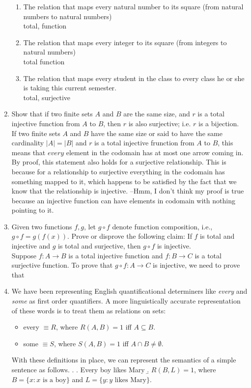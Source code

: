 \documentclass[12pt]{article}
\begin{document}
\begin{enumerate}
\begin{enumerate}
\item The relation that maps every natural number to its square (from natural numbers to natural numbers) \\
    total, function
\item The relation that maps every integer to its square (from integers to natural numbers) \\
    total function 
\item The relation that maps every student in the class to every class he or she is taking this current semester. \\
    total, surjective
\end{enumerate}
\item Show that if two finite sets $A$ and $B$ are the same size, and $r$ is a total injective function from $A$ to $B$, then $r$ is also surjective; i.e. $r$ is a bijection. \\
    If two finite sets $A$ and $B$ have the same size or said to have the same cardinality $|A| = |B|$ and $r$ is a total injective frunction from $A$ to $B$, this means that $every$ element in the codomain has at most one arrow coming in. By proof, this statement also holds for a surjective relationship. This is because for a relationship to surjective everything in the codomain has something mapped to it, which happens to be satisfied by the fact that we know that the relationship is injective. --Hmm, I don't think my proof is true because an injective function can have elements in codomain with nothing pointing to it. \\
\item Given two functions $f,g$, let $g \circ f$ denote function composition, i.e., $g \circ f=g(f(x))$. Prove or disprove the following claim: If $f$ is total and injective and $g$ is total and surjective, then $g \circ f$ is injective. \\
    Suppose $f: A \rightarrow B$ is a total injective function and $f: B \rightarrow C$ is a total surjective function. To prove that $g \circ f: A \rightarrow C$ is injective, we need to prove that 
\item We have been representing English quantificational determiners like \emph{every} and \emph{some} as first order quantifiers. A more linguistically accurate representation of these words is to treat them as relations on sets:
\begin{itemize}
\item every $\equiv R$, where $R(A,B)=1$ iff $A \subseteq B$.
\item some $\equiv S$, where $S(A,B)=1$ iff $A\cap B \neq \emptyset$.
\end{itemize}
With these definitions in place, we can represent the semantics of a simple sentence as follows.
\ex. \a. Every boy likes Mary
\b. $R(B,L)=1$, where $B=\{x: x \text{ is a boy}\}$ and $L=\{y: y \text{ likes Mary}\}$.


\end{enumerate}
\end{document}
